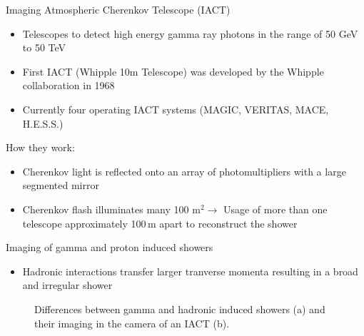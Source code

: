 \documentclass[aspectratio=1610, 10pt]{beamer}
\begin{document}
\begin{frame}{Imaging Atmospheric Cherenkov Telescope (IACT)}
  \begin{itemize}
    \item Telescopes to detect high energy gamma ray photons in the range of 50 GeV to 50 TeV
    \medskip
    \item First IACT (Whipple 10m Telescope) was developed by the Whipple collaboration in 1968
    \medskip
    \item Currently four operating IACT systems (MAGIC, VERITAS, MACE, H.E.S.S.)
  \end{itemize}
\vspace{0.5cm}
How they work:
\begin{itemize}
  \item Cherenkov light is reflected onto an array of photomultipliers with a large segmented mirror
  \medskip
  \item Cherenkov flash illuminates many 100 $\mathrm{m}^2 \rightarrow$ Usage of more than one telescope approximately 100$\, \mathrm{m}$ apart to
  reconstruct the shower
\end{itemize}
\end{frame}

\begin{frame}{Imaging of gamma and proton induced showers}
  \begin{itemize}
    \item Hadronic interactions transfer larger tranverse momenta resulting in a broad and irregular shower
  \end{itemize}
  \begin{figure}
      \hspace{0.5cm}
      \caption{Differences between gamma and hadronic induced showers (a)  and their imaging in the camera of an IACT (b).}
  \end{figure}
\end{frame}
\end{document}
